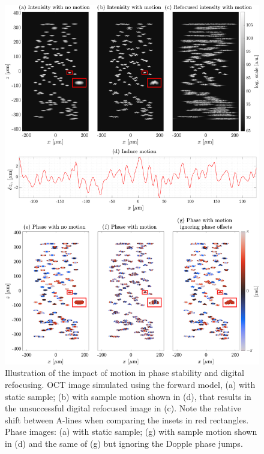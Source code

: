 \begin{figure}[htb!]
	\centering
	\includegraphics[width=.95\textwidth]{Figures/TheoreticalBasis/MotionEx.pdf}
	\caption[Illustration of the impact of motion in phase stability and digital refocusing.]{Illustration of the impact of motion in phase stability and digital refocusing. OCT image simulated using the forward model, (a) with static sample; (b) with sample motion shown in (d), that results in the unsuccessful digital refocused image in (c). Note the relative shift between A-lines when comparing the insets in red rectangles. Phase images: (a) with static sample; (g) with sample motion shown in (d) and the same of (g) but ignoring the Dopple phase jumps.}
	\label{fig:motionEx}
\end{figure}

\FloatBarrier

